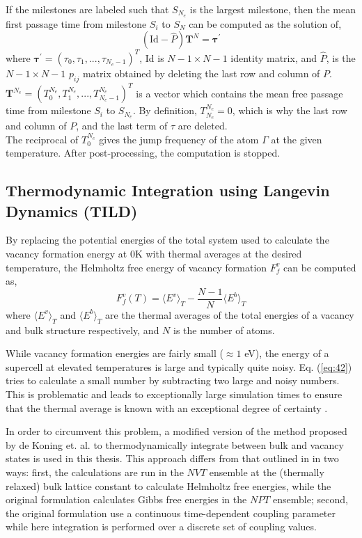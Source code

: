 \documentclass{article}
\begin{document}
If the milestones are labeled such that $S_{N_e}$ is the largest milestone, then the mean first passage time from milestone $S_i$ to $S_N$ can be computed as the solution of,
%
\begin{equation} \label{eq:41}
(\text{Id} - \hat{P})\bm{T}^N = \bm{\tau}^{\prime}
\end{equation}
%
where $\bm{\tau}^{\prime} = (\tau_0, \tau_1,...,\tau_{N_e - 1})^T$, Id is $N-1 \times N-1$ identity matrix, and $\hat{P}$, is the $N-1 \times N-1$ $p_{ij}$ matrix obtained by deleting the last row and column of $P$. $\bm{T}^{N_e} = (T_0^{N_e}, T_1^{N_e},...,T_{N_e-1}^{N_e})^T$ is a vector which contains the mean free passage time from milestone $S_i$ to $S_{N_e}$. By definition, $T_{N_e}^{N_e} = 0$, which is why the last row and column of $P$, and the last term of $\tau$ are deleted. \\

The reciprocal of $T_0^{N_e}$ gives the jump frequency of the atom $\Gamma$ at the given temperature. After post-processing, the computation is stopped.

\subsection{Thermodynamic Integration using Langevin Dynamics (TILD)} \label{TILD}

By replacing the potential energies of the total system used to calculate the vacancy formation energy at 0K with thermal averages at the desired temperature, the Helmholtz free energy of vacancy formation $F_f^v$ can be computed as,
%
\begin{equation} \label{eq:42}
F_f^v(T) = \langle E^v \rangle_T - \frac{N-1}{N} \langle E^b \rangle_T
\end{equation}
%
where $\langle E^v \rangle_T$ and $\langle E^b \rangle_T$ are the thermal averages of the total energies of a vacancy and bulk structure respectively, and $N$ is the number of atoms.

While vacancy formation energies are fairly small ($\approx 1$ eV), the energy of a supercell at elevated temperatures is large and typically quite noisy. Eq. (\ref{eq:42}) tries to calculate a small number by subtracting two large and noisy numbers. This is problematic and leads to exceptionally large simulation times to ensure that the thermal average is known with an exceptional degree of certainty \cite{Glensk2013}.

In order to circumvent this problem, a modified version \cite{Wen2012} of the method proposed by de Koning et. al. \cite{deKoning} to thermodynamically integrate between bulk and vacancy states is used in this thesis. This approach differs from that outlined in \cite{deKoning} in two ways: first, the calculations are run in the $NVT$ ensemble at the (thermally relaxed) bulk lattice constant to calculate Helmholtz free energies, while the original formulation calculates Gibbs free energies in the $NPT$ ensemble; second, the original formulation use a continuous time-dependent coupling parameter while here integration is performed over a discrete set of coupling values.
\end{document}
